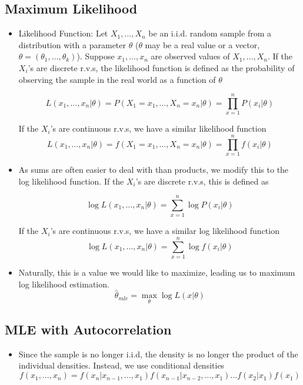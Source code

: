 \documentclass[11pt]{article}
\begin{document}
\subsection{Maximum Likelihood}
\begin{itemize}
    \item Likelihood Function: Let $X_1, \ldots, X_n$ be an i.i.d. random sample from a 
    distribution with a parameter $\theta$ ($\theta$ may be a real value or a vector, $\theta =
    (\theta_1, \ldots, \theta_k)$). Suppose $x_1, \ldots, x_n$ are observed values of $X_1, 
    \ldots, X_n$. If the $X_i$'s are discrete r.v.s, the likelihood function is defined as the 
    probability of observing the sample in the real world as a function of $\theta$

    \[L(x_1, \ldots, x_n | \theta) = P(X_1 = x_1, \ldots, X_n = x_n | \theta) = \prod_{x=1}^{n} 
    P(x_i | \theta) \]

    If the $X_i$'s are continuous r.v.s, we have a similar likelihood function
    \[L(x_1, \ldots, x_n | \theta) = f(X_1 = x_1, \ldots, X_n = x_n | \theta) = \prod_{x=1}^{n} 
    f(x_i | \theta) \]

    \item As sums are often easier to deal with than products, we modify this to the log 
    likelihood function.  If the $X_i$'s are discrete r.v.s, this is defined as

    \[ \log{L(x_1, \ldots, x_n | \theta)} = \sum_{x=1}^{n} \log{P(x_i | \theta)}\]
    
    If the $X_i$'s are continuous r.v.s, we have a similar log likelihood function
    \[ \log{L(x_1, \ldots, x_n | \theta)} = \sum_{x=1}^{n} \log{f(x_i | \theta)} \]
    
    \item Naturally, this is a value we would like to maximize, leading us to maximum 
    log likelihood estimation.
    \[ \hat{\theta}_{mle} = \max_{\theta}{\log{L(x | \theta)}}\]
\end{itemize}

\subsection{MLE with Autocorrelation}
\begin{itemize}
    \item Since the sample is no longer i.i.d, the density is no longer the product of the 
    individual densities. Instead, we use conditional densities 
    \[f(x_1, \ldots, x_n) = f(x_n | x_{n-1}, \ldots, x_1) f(x_{n-1} | x_{n-2}, \ldots, x_1)
    \ldots f(x_2 | x_1) f(x_1)\]
\end{itemize}
\end{document}

